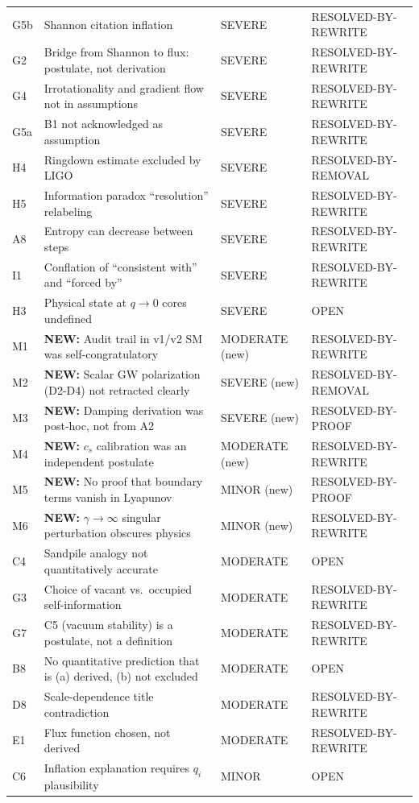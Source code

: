 \documentclass[reprint]{revtex4-2}
\begin{document}
\begin{table}[h]
\begin{tabular}{p{0.5cm}p{5.5cm}ll}
G5b & Shannon citation inflation & SEVERE & RESOLVED-BY-REWRITE \\
G2 & Bridge from Shannon to flux: postulate, not derivation & SEVERE & RESOLVED-BY-REWRITE \\
G4 & Irrotationality and gradient flow not in assumptions & SEVERE & RESOLVED-BY-REWRITE \\
G5a & B1 not acknowledged as assumption & SEVERE & RESOLVED-BY-REWRITE \\
H4 & Ringdown estimate excluded by LIGO & SEVERE & RESOLVED-BY-REMOVAL \\
H5 & Information paradox ``resolution'' relabeling & SEVERE & RESOLVED-BY-REWRITE \\
A8 & Entropy can decrease between steps & SEVERE & RESOLVED-BY-REWRITE \\
I1 & Conflation of ``consistent with'' and ``forced by'' & SEVERE & RESOLVED-BY-REWRITE \\
H3 & Physical state at $q\to 0$ cores undefined & SEVERE & OPEN \\
M1 & \textbf{NEW:} Audit trail in v1/v2 SM was self-congratulatory & MODERATE (new) & RESOLVED-BY-REWRITE \\
M2 & \textbf{NEW:} Scalar GW polarization (D2-D4) not retracted clearly & SEVERE (new) & RESOLVED-BY-REMOVAL \\
M3 & \textbf{NEW:} Damping derivation was post-hoc, not from A2 & SEVERE (new) & RESOLVED-BY-PROOF \\
M4 & \textbf{NEW:} $c_s$ calibration was an independent postulate & MODERATE (new) & RESOLVED-BY-REWRITE \\
M5 & \textbf{NEW:} No proof that boundary terms vanish in Lyapunov & MINOR (new) & RESOLVED-BY-PROOF \\
M6 & \textbf{NEW:} $\gamma\to\infty$ singular perturbation obscures physics & MINOR (new) & RESOLVED-BY-REWRITE \\
C4 & Sandpile analogy not quantitatively accurate & MODERATE & OPEN \\
G3 & Choice of vacant vs.\ occupied self-information & MODERATE & RESOLVED-BY-REWRITE \\
G7 & C5 (vacuum stability) is a postulate, not a definition & MODERATE & RESOLVED-BY-REWRITE \\
B8 & No quantitative prediction that is (a) derived, (b) not excluded & MODERATE & OPEN \\
D8 & Scale-dependence title contradiction & MODERATE & RESOLVED-BY-REWRITE \\
E1 & Flux function chosen, not derived & MODERATE & RESOLVED-BY-REWRITE \\
C6 & Inflation explanation requires $q_i$ plausibility & MINOR & OPEN \\
\bottomrule
\end{tabular}
\end{table}
\end{document}
